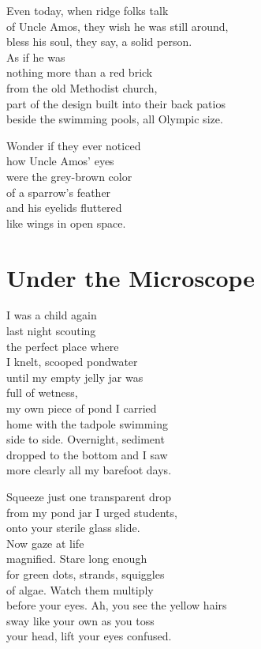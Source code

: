 \documentclass[twoside,10pt]{book}
\begin{document}
Even today, when ridge folks talk\\
of Uncle Amos, they wish he was still around,\\
bless his soul, they say, a solid person.\\
As if he was\\
nothing more than a red brick\\
from the old Methodist church,\\
part of the design built into their back patios\\
beside the swimming pools, all Olympic size.

Wonder if they ever noticed\\
how Uncle Amos' eyes\\
were the grey-brown color\\
of a sparrow's feather\\
and his eyelids fluttered\\
like wings in open space.


\clearpage
\section{Under the Microscope}

I was a child again\\
last night scouting\\
the perfect place where\\
I knelt, scooped pondwater\\
until my empty jelly jar was\\
full of wetness,\\
my own piece of pond I carried\\
home with the tadpole swimming\\
side to side. Overnight, sediment\\
dropped to the bottom and I saw\\
more clearly all my barefoot days.

Squeeze just one transparent drop\\
from my pond jar I urged students,\\
onto your sterile glass slide.\\
Now gaze at life\\
magnified. Stare long enough\\
for green dots, strands, squiggles\\
of algae. Watch them multiply\\
before your eyes. Ah, you see the yellow hairs\\
sway like your own as you toss\\
your head, lift your eyes confused.
\end{document}
